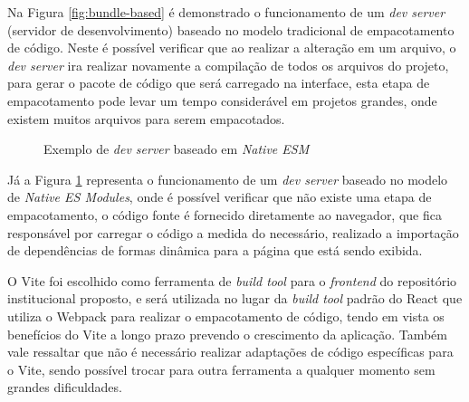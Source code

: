 Na Figura \ref{fig:bundle-based} é demonstrado o funcionamento de um \emph{dev server}
(servidor de desenvolvimento) baseado no modelo tradicional de empacotamento de código.
Neste é possível verificar que ao realizar a alteração em um arquivo, o \emph{dev server}
ira realizar novamente a compilação de todos os arquivos do projeto, para gerar o pacote
de código que será carregado na interface, esta etapa de empacotamento pode levar um tempo
considerável em projetos grandes, onde existem muitos arquivos para serem empacotados.

\begin{figure}[H]
    \caption{Exemplo de \emph{dev server} baseado em \emph{Native ESM}}
    \centering
    \label{fig:esm-based}
\end{figure}

Já a Figura \ref{fig:esm-based} representa o funcionamento de um \emph{dev server}
baseado no modelo de \emph{Native ES Modules}, onde é possível verificar que
não existe uma etapa de empacotamento, o código fonte é fornecido diretamente
ao navegador, que fica responsável por carregar o código a medida do necessário,
realizado a importação de dependências de formas dinâmica para a página que está
sendo exibida.

O Vite foi escolhido como ferramenta de \emph{build tool} para o \emph{frontend}
do repositório institucional proposto, e será utilizada no lugar da \emph{build tool}
padrão do React que utiliza o Webpack para realizar o empacotamento de código,
tendo em vista os benefícios do Vite a longo prazo prevendo o crescimento da aplicação.
Também vale ressaltar que não é necessário realizar adaptações de código específicas
para o Vite, sendo possível trocar para outra ferramenta a qualquer momento sem
grandes dificuldades.


